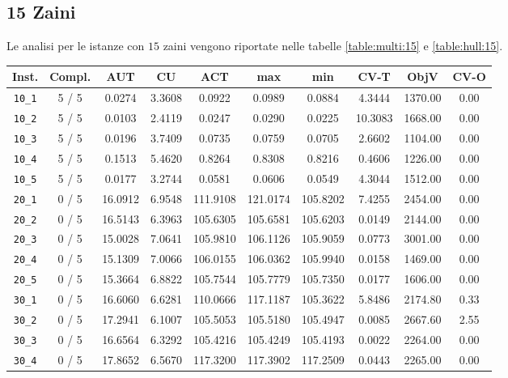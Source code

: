 \subsection{15 Zaini}

Le analisi per le istanze con $15$ zaini vengono riportate nelle tabelle
\ref{table:multi:15} e \ref{table:hull:15}.


\begin{table}[h!]
\begin{center}
\small
\begin{tabular}{| c | c | c | c | c | c | c | c | c | c |}
\hline
Inst. & Compl. & AUT & CU & ACT & max & min & CV-T & ObjV & CV-O \\
\hline
\verb|10_1| & 5 / 5 & 0.0274 & 3.3608 & 0.0922 & 0.0989 & 0.0884 & 4.3444 & 1370.00 & 0.00\\ 
\verb|10_2| & 5 / 5 & 0.0103 & 2.4119 & 0.0247 & 0.0290 & 0.0225 & 10.3083 & 1668.00 & 0.00\\ 
\verb|10_3| & 5 / 5 & 0.0196 & 3.7409 & 0.0735 & 0.0759 & 0.0705 & 2.6602 & 1104.00 & 0.00\\ 
\verb|10_4| & 5 / 5 & 0.1513 & 5.4620 & 0.8264 & 0.8308 & 0.8216 & 0.4606 & 1226.00 & 0.00\\ 
\verb|10_5| & 5 / 5 & 0.0177 & 3.2744 & 0.0581 & 0.0606 & 0.0549 & 4.3044 & 1512.00 & 0.00\\ 
\verb|20_1| & 0 / 5 & 16.0912 & 6.9548 & 111.9108 & 121.0174 & 105.8202 & 7.4255 & 2454.00 & 0.00\\ 
\verb|20_2| & 0 / 5 & 16.5143 & 6.3963 & 105.6305 & 105.6581 & 105.6203 & 0.0149 & 2144.00 & 0.00\\ 
\verb|20_3| & 0 / 5 & 15.0028 & 7.0641 & 105.9810 & 106.1126 & 105.9059 & 0.0773 & 3001.00 & 0.00\\ 
\verb|20_4| & 0 / 5 & 15.1309 & 7.0066 & 106.0155 & 106.0362 & 105.9940 & 0.0158 & 1469.00 & 0.00\\ 
\verb|20_5| & 0 / 5 & 15.3664 & 6.8822 & 105.7544 & 105.7779 & 105.7350 & 0.0177 & 1606.00 & 0.00\\ 
\verb|30_1| & 0 / 5 & 16.6060 & 6.6281 & 110.0666 & 117.1187 & 105.3622 & 5.8486 & 2174.80 & 0.33\\ 
\verb|30_2| & 0 / 5 & 17.2941 & 6.1007 & 105.5053 & 105.5180 & 105.4947 & 0.0085 & 2667.60 & 2.55\\ 
\verb|30_3| & 0 / 5 & 16.6564 & 6.3292 & 105.4216 & 105.4249 & 105.4193 & 0.0022 & 2264.00 & 0.00\\ 
\verb|30_4| & 0 / 5 & 17.8652 & 6.5670 & 117.3200 & 117.3902 & 117.2509 & 0.0443 & 2265.00 & 0.00\\ 

\end{tabular}
\end{center}
\end{table}

